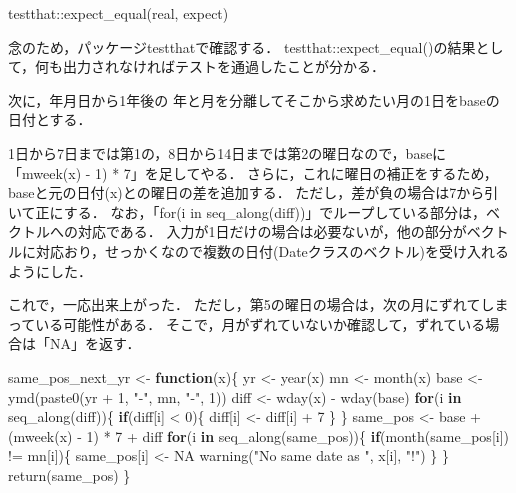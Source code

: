 \documentclass[
]{article}
\newenvironment{Shaded}{\begin{snugshade}}{\end{snugshade}}
\newcommand{\ConstantTok}[1]{\textcolor[rgb]{0.00,0.00,0.00}{#1}}
\newcommand{\ControlFlowTok}[1]{\textcolor[rgb]{0.13,0.29,0.53}{\textbf{#1}}}
\newcommand{\DecValTok}[1]{\textcolor[rgb]{0.00,0.00,0.81}{#1}}
\newcommand{\FunctionTok}[1]{\textcolor[rgb]{0.00,0.00,0.00}{#1}}
\newcommand{\NormalTok}[1]{#1}
\newcommand{\OtherTok}[1]{\textcolor[rgb]{0.56,0.35,0.01}{#1}}
\newcommand{\SpecialCharTok}[1]{\textcolor[rgb]{0.00,0.00,0.00}{#1}}
\newcommand{\StringTok}[1]{\textcolor[rgb]{0.31,0.60,0.02}{#1}}
\begin{document}
\begin{Shaded}
\begin{Highlighting}[]
\NormalTok{testthat}\SpecialCharTok{::}\FunctionTok{expect\_equal}\NormalTok{(real, expect)}
\end{Highlighting}
\end{Shaded}

念のため，パッケージtestthatで確認する．
testthat::expect\_equal()の結果として，何も出力されなければテストを通過したことが分かる．

次に，年月日から1年後の
年と月を分離してそこから求めたい月の1日をbaseの日付とする．

1日から7日までは第1の，8日から14日までは第2の曜日なので，baseに「mweek(x) - 1) * 7」を足してやる．
さらに，これに曜日の補正をするため，baseと元の日付(x)との曜日の差を追加する．
ただし，差が負の場合は7から引いて正にする．
なお，「for(i in seq\_along(diff))」でループしている部分は，ベクトルへの対応である．
入力が1日だけの場合は必要ないが，他の部分がベクトルに対応おり，せっかくなので複数の日付(Dateクラスのベクトル)を受け入れるようにした．

これで，一応出来上がった．
ただし，第5の曜日の場合は，次の月にずれてしまっている可能性がある．
そこで，月がずれていないか確認して，ずれている場合は「NA」を返す．

\begin{Shaded}
\begin{Highlighting}[]
\NormalTok{same\_pos\_next\_yr }\OtherTok{\textless{}{-}} \ControlFlowTok{function}\NormalTok{(x)\{}
\NormalTok{  yr }\OtherTok{\textless{}{-}} \FunctionTok{year}\NormalTok{(x)}
\NormalTok{  mn }\OtherTok{\textless{}{-}} \FunctionTok{month}\NormalTok{(x)}
\NormalTok{  base }\OtherTok{\textless{}{-}} \FunctionTok{ymd}\NormalTok{(}\FunctionTok{paste0}\NormalTok{(yr }\SpecialCharTok{+} \DecValTok{1}\NormalTok{, }\StringTok{"{-}"}\NormalTok{, mn, }\StringTok{"{-}"}\NormalTok{, }\DecValTok{1}\NormalTok{))}
\NormalTok{  diff }\OtherTok{\textless{}{-}} \FunctionTok{wday}\NormalTok{(x) }\SpecialCharTok{{-}} \FunctionTok{wday}\NormalTok{(base)}
  \ControlFlowTok{for}\NormalTok{(i }\ControlFlowTok{in} \FunctionTok{seq\_along}\NormalTok{(diff))\{}
    \ControlFlowTok{if}\NormalTok{(diff[i] }\SpecialCharTok{\textless{}} \DecValTok{0}\NormalTok{)\{ diff[i] }\OtherTok{\textless{}{-}}\NormalTok{ diff[i] }\SpecialCharTok{+} \DecValTok{7}\NormalTok{ \}}
\NormalTok{  \}}
\NormalTok{  same\_pos }\OtherTok{\textless{}{-}}\NormalTok{ base }\SpecialCharTok{+}\NormalTok{ (}\FunctionTok{mweek}\NormalTok{(x) }\SpecialCharTok{{-}} \DecValTok{1}\NormalTok{) }\SpecialCharTok{*} \DecValTok{7} \SpecialCharTok{+}\NormalTok{ diff}
  \ControlFlowTok{for}\NormalTok{(i }\ControlFlowTok{in} \FunctionTok{seq\_along}\NormalTok{(same\_pos))\{}
    \ControlFlowTok{if}\NormalTok{(}\FunctionTok{month}\NormalTok{(same\_pos[i]) }\SpecialCharTok{!=}\NormalTok{ mn[i])\{}
\NormalTok{      same\_pos[i] }\OtherTok{\textless{}{-}} \ConstantTok{NA}
      \FunctionTok{warning}\NormalTok{(}\StringTok{"No same date as "}\NormalTok{, x[i], }\StringTok{"!"}\NormalTok{)}
\NormalTok{    \}}
\NormalTok{  \}}
  \FunctionTok{return}\NormalTok{(same\_pos)}
\NormalTok{\}}
\end{Highlighting}
\end{Shaded}
\end{document}
